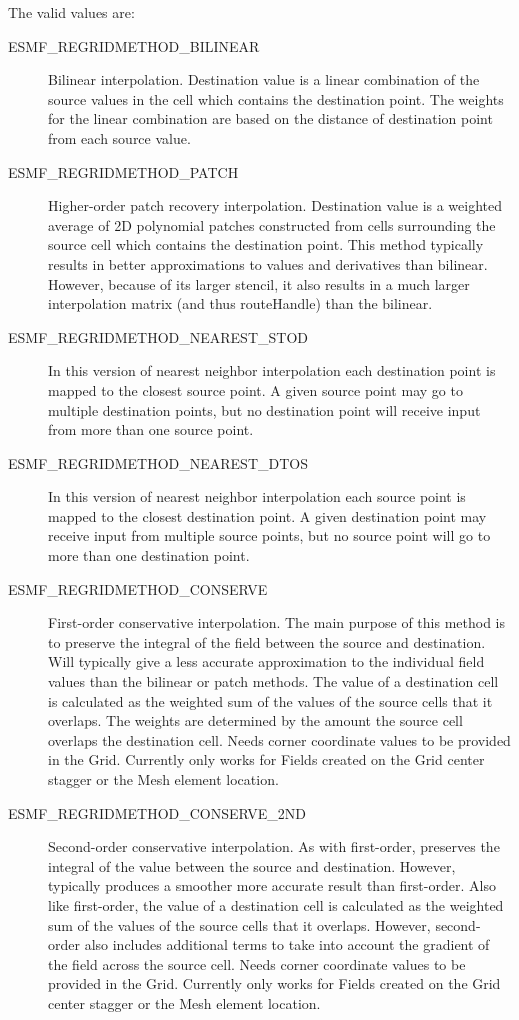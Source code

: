 The valid values are:
\begin{description}
\item [ESMF\_REGRIDMETHOD\_BILINEAR]
      Bilinear interpolation. Destination value is a linear combination of the source values in the cell which contains the destination point. The weights for the linear combination are based on the distance of destination point from each source value. 
\item [ESMF\_REGRIDMETHOD\_PATCH]
      Higher-order patch recovery interpolation. Destination value is a weighted average of 2D polynomial patches constructed from cells surrounding the source cell which contains the destination point. This method typically results in better approximations to values and derivatives than bilinear. However, because of its larger stencil, it also results in a much larger interpolation matrix (and thus routeHandle) than the bilinear. 
\item [ESMF\_REGRIDMETHOD\_NEAREST\_STOD]
      In this version of nearest neighbor interpolation each destination point is mapped to the closest source point. A given source point may go to multiple destination points, but no destination point will receive input from more than one source point. 
\item [ESMF\_REGRIDMETHOD\_NEAREST\_DTOS]
      In this version of nearest neighbor interpolation each source point is mapped to the closest destination point. A given destination point may receive input from multiple source points, but no source point will go to more than one destination point. 
\item [ESMF\_REGRIDMETHOD\_CONSERVE]
      First-order conservative interpolation. The main purpose of this method is to preserve the integral of the field between the source and destination. 
      Will typically give a less accurate approximation to the individual field values than the bilinear or patch methods. The value of a destination cell is calculated as the weighted sum of the values of the source cells that it overlaps. The weights are determined by the amount the source cell overlaps the destination cell. Needs corner coordinate values to be provided in the Grid. Currently only works for Fields created on the Grid center stagger or the Mesh element location. 
\item [ESMF\_REGRIDMETHOD\_CONSERVE\_2ND]
      Second-order conservative interpolation. As with first-order, preserves the integral of the value between the source and destination. However, typically produces a smoother more accurate result than first-order. Also like first-order, the value of a destination cell is calculated as the weighted sum of the values of the source cells that it overlaps. However, second-order also includes additional terms to take into account the gradient of the field across the source cell. Needs corner coordinate values to be provided in the Grid. Currently only works for Fields created on the Grid center stagger or the Mesh element location. 


\end{description}


